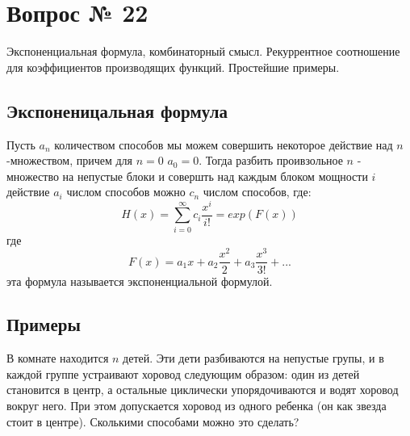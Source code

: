 \chapter{Вопрос № 22}

Экспоненциальная формула, комбинаторный смысл. Рекуррентное соотношение для коэффициентов производящих функций. Простейшие примеры.

\section{Экспоненицальная формула}

Пусть $a_n$ количеством способов мы можем совершить некоторое действие над $n$-множеством, причем для $n=0$ $a_0 = 0$. Тогда разбить проивзольное $n$ - множество на непустые блоки и совершть над каждым блоком мощности $i$ действие $a_i$ числом способов можно $c_n$ числом способов, где:
\begin{equation}
	H\left(x\right) = \sum_{i=0}^\infty c_i \frac{x^i}{i!} = exp\left(F\left(x\right)\right)
\end{equation}
где
\[
	F\left(x\right) = a_1 x + a_2 \frac{x^2}{2} + a_3 \frac{x^3}{3!} + ...
\]
эта формула называется экспоненциальной формулой.

\section{Примеры}

В комнате находится $n$ детей. Эти дети разбиваются на непустые групы, и в каждой группе устраивают хоровод следующим образом: один из детей становится в центр, а остальные циклически упорядочиваются и водят хоровод вокруг него. При этом допускается хоровод из одного ребенка (он как звезда стоит в центре). Сколькими способами можно это сделать?

